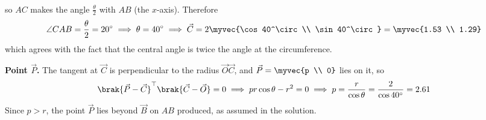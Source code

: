 \begin{enumerate}[label=\thesubsection.\arabic*, ref=\thesubsection.\theenumi]
\begin{align}
\end{align}
so $AC$ makes the angle $\frac{\theta}{2}$ with $AB$ (the $x$-axis). Therefore
\begin{align}
	\angle CAB = \frac{\theta}{2} = 20^\circ \implies \theta = 40^\circ
	\implies \vec{C} = 2\myvec{\cos 40^\circ \\ \sin 40^\circ} = \myvec{1.53 \\ 1.29}
\end{align}
which agrees with the fact that the central angle is twice the angle at the circumference.

\textbf{Point $\vec{P}$.} The tangent at $\vec{C}$ is perpendicular to the radius $\vec{O}\vec{C}$, and $\vec{P} = \myvec{p \\ 0}$ lies on it, so
\begin{align}
	\brak{\vec{P} - \vec{C}}^{\top}\brak{\vec{C} - \vec{O}} = 0 \implies pr\cos\theta - r^2 = 0 \implies p = \frac{r}{\cos\theta} = \frac{2}{\cos 40^\circ} = 2.61
\end{align}
Since $p > r$, the point $\vec{P}$ lies beyond $\vec{B}$ on $AB$ produced, as assumed in the solution.


\end{enumerate}
